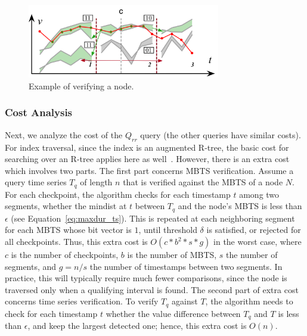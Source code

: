 \begin{figure}[tb]
    \centering
    \includegraphics[width=0.75\textwidth]{Figures/partition_checkpoint_check.png}
    \caption{Example of verifying a \sbtsr node.}
    \label{fig:part_checkpnt}
\end{figure}

\subsubsection{Cost Analysis}
\label{subsubsec:cost}
Next, we analyze the cost of the $Q_{rr}$ query (the other queries have similar costs). For index traversal, since the index is an augmented R-tree, the basic cost for searching over an R-tree applies here as well~\cite{Guttman1984}. However, there is an extra cost which involves two parts. The first part concerns MBTS verification. Assume a query time series $T_q$ of length $n$ that is verified against the MBTS of a node $N$. For each checkpoint, the algorithm checks for each timestamp $t$ among two segments, whether the mindist at $t$ between $T_q$ and the node’s MBTS is less than $\epsilon$ (see Equation~\ref{eq:maxdur_ts}). This is repeated at each neighboring segment for each MBTS whose bit vector is $1$, until threshold $\delta$ is satisfied, or rejected for all checkpoints. Thus, this extra cost is $O(c*b^2*s*g)$ in the worst case, where $c$ is the number of checkpoints, $b$ is the number of MBTS, $s$ the number of segments, and $g=n/s$ the number of timestamps between two segments. In practice, this will typically require much fewer comparisons, since the node is traversed only when a qualifying interval is found. The second part of extra cost concerns time series verification. To verify $T_q$ against $T$, the algorithm needs to check for each timestamp $t$ whether the value difference between $T_q$ and $T$ is less than $\epsilon$, and keep the largest detected one; hence, this extra cost is $O(n)$.